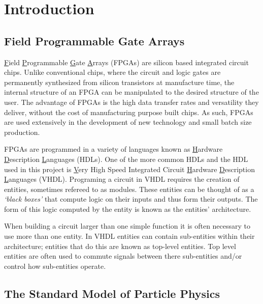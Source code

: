 \section{Introduction}

  \subsection{Field Programmable Gate Arrays}

    \underline{F}ield \underline{P}rogrammable \underline{G}ate \underline{A}rrays (FPGAs) are silicon based integrated circuit chips.
    Unlike conventional chips, where the circuit and logic gates are permanently synthesized from silicon transistors at manufacture time, the internal structure of an FPGA can be manipulated to the desired structure of the user.
    The advantage of FPGAs is the high data transfer rates and versatility they deliver, without the cost of manufacturing purpose built chips. 
    As such, FPGAs are used extensively in the development of new technology and small batch size production. \cite{fpga}
    \par
    FPGAs are programmed in a variety of languages known as \underline{H}ardware \underline{D}escription \underline{L}anguages (HDLs).
    One of the more common HDLs and the HDL used in this project is \underline{V}ery High Speed Integrated Circuit \underline{H}ardware \underline{D}escription \underline{L}anguages (VHDL).
    Programing a circuit in VHDL requires the creation of entities, sometimes refereed to as modules.
    These entities can be thought of as a \textit{`black boxes'} that compute logic on their inputs and thus form their outputs.
    The form of this logic computed by the entity is known as the entities' architecture.
    \par
    When building a circuit larger than one simple function it is often necessary to use more than one entity.
    In VHDL entities can contain sub-entities within their architecture; entities that do this are known as top-level entities.
    Top level entities are often used to commute signals between there sub-entities and/or control how sub-entities operate.

	\subsection{The Standard Model of Particle Physics}

